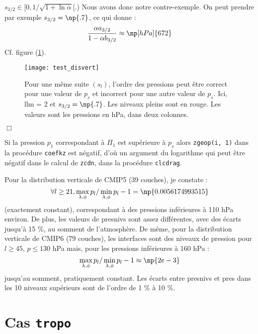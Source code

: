 \documentclass[a4paper,french]{article}
\begin{document}
$s_{3/2} \in [0, 1 / \sqrt{1 + \ln \alpha}[$.) Nous avons donc notre
contre-exemple. On peut prendre par exemple $s_{3/2} = \np{.7}$, ce qui
donne :
\begin{equation*}
  \frac{\alpha a_{3/2}}{1 - \alpha b_{3/2}} \approx \np[hPa]{672}
\end{equation*}
Cf. figure (\ref{fig:test_disvert}).
\begin{figure}[htbp]
  \centering
  \texttt{[image: test\_disvert]}
  \caption[Ordre des pressions dépendant de $p_s$]{Pour une même suite
    $(s_l)$, l'ordre des pressions peut être correct pour une valeur
    de $p_s$ et incorrect pour une autre valeur de $p_s$. Ici, llm = 2
    et $s_{3/2} = \np{.7}$. Les niveaux pleins sont en rouge. Les
    valeurs sont les pressions en hPa, dans deux colonnes.}
  \label{fig:test_disvert}
\end{figure}
$\Box$

Si la pression $p_1$ correspondant à $\Pi_1$ est supérieure à $p_s$
alors \verb+zgeop(i, 1)+ dans la procédure \verb+coefkz+ est négatif,
d'où un argument du logarithme qui peut être négatif dans le calcul de
\verb+zcdn+, dans la procédure \verb+clcdrag+.

Pour la distribution verticale de CMIP5 (39 couches), je
constate :
\begin{equation*}
  \forall l \ge 21,
  \max_{\lambda, \phi} p_l / \min_{\lambda, \phi} p_l - 1 = \np{0.0056174993515}
\end{equation*}
(exactement constant), correspondant à des pressions inférieures à 110
hPa environ. De plus, les valeurs de presnivs sont assez différentes,
avec des écarts jusqu'à 15 \%, au somment de l'atmosphère. De même,
pour la distribution verticale de CMIP6 (79 couches), les interfaces
sont des niveaux de pression pour $l \ge 45$, $p \le 130$ hPa mais,
pour les pressions inférieures à 160 hPa :
\begin{equation*}
  \max_{\lambda, \phi} p_l / \min_{\lambda, \phi} p_l - 1
  \approx \np{2e-3}
\end{equation*}
jusqu'au somment, pratiquement constant. Les écarts entre presnivs et
pres dans les 10 niveaux supérieurs sont de l'ordre de 1 \% à 10 \%.

\section{Cas \texttt{tropo}}
\end{document}
